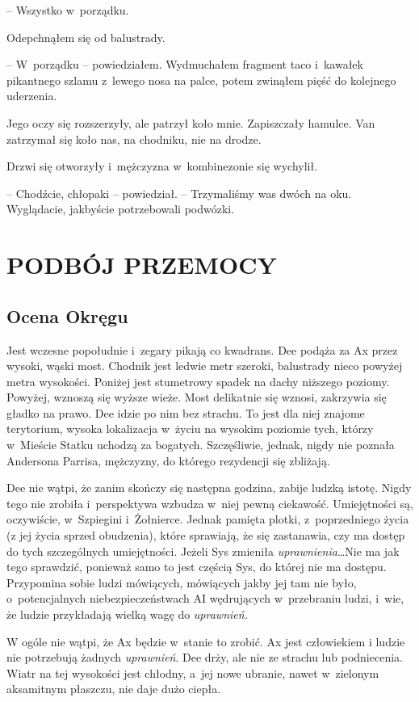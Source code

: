 \documentclass[oneside,polish,11pt,sfheadings]{mwbk}
\begin{document}
-- Wszystko w~porządku.

Odepchnąłem się od balustrady.

-- W~porządku -- powiedziałem. Wydmuchałem fragment taco i~kawałek
pikantnego szlamu z~lewego nosa na palce, potem zwinąłem pięść do
kolejnego uderzenia.

Jego oczy się rozszerzyły, ale patrzył koło mnie. Zapiszczały hamulce.
Van zatrzymał się koło nas, na chodniku, nie na drodze.

Drzwi się otworzyły i~mężczyzna w~kombinezonie się wychylił.

-- Chodźcie, chłopaki -- powiedział. -- Trzymaliśmy was dwóch na oku.
Wyglądacie, jakbyście potrzebowali podwózki.


\part{PODBÓJ PRZEMOCY}

\chapter{Ocena Okręgu}

Jest wczesne popołudnie i~zegary pikają co kwadrans. Dee podąża za Ax
przez wysoki, wąski most. Chodnik jest ledwie metr szeroki, balustrady
nieco powyżej metra wysokości. Poniżej jest stumetrowy spadek na dachy
niższego poziomy. Powyżej, wznoszą się wyższe wieże. Most delikatnie się
wznosi, zakrzywia się gładko na prawo. Dee idzie po nim bez strachu. To
jest dla niej znajome terytorium, wysoka lokalizacja w~życiu na wysokim
poziomie tych, którzy w~Mieście Statku uchodzą za bogatych. Szczęśliwie,
jednak, nigdy nie poznała Andersona Parrisa, mężczyzny, do którego
rezydencji się zbliżają.

Dee nie wątpi, że zanim skończy się następna godzina, zabije ludzką
istotę. Nigdy tego nie zrobiła i~perspektywa wzbudza w~niej pewną
ciekawość. Umiejętności są, oczywiście, w~Szpiegini i~Żołnierce. Jednak
pamięta plotki, z~poprzedniego życia (z jej życia sprzed obudzenia),
które sprawiają, że się zastanawia, czy ma dostęp do tych szczególnych
umiejętności. Jeżeli Sys zmieniła \emph{uprawnienia}\ldots Nie ma jak tego
sprawdzić, ponieważ samo to jest częścią Sys, do której nie ma dostępu.
Przypomina sobie ludzi mówiących, mówiących jakby jej tam nie było, o~potencjalnych niebezpieczeństwach AI wędrujących w~przebraniu ludzi, i~wie, że ludzie przykładają wielką wagę do \emph{uprawnień.}

W ogóle nie wątpi, że Ax będzie w~stanie to zrobić. Ax jest człowiekiem
i ludzie nie potrzebują żadnych \emph{uprawnień}. Dee drży, ale nie ze
strachu lub podniecenia. Wiatr na tej wysokości jest chłodny, a~jej nowe
ubranie, nawet w~zielonym aksamitnym płaszczu, nie daje dużo ciepła.
\end{document}
